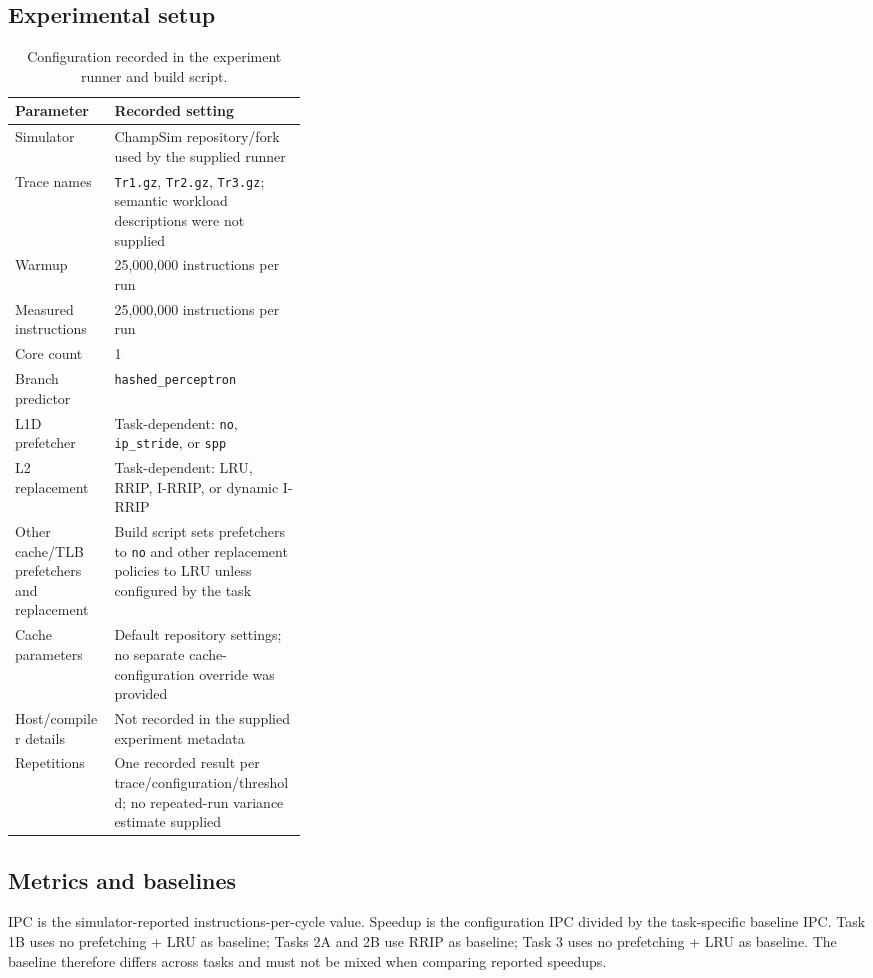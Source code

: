 \documentclass[11pt]{article}
\begin{document}
\subsection{Experimental setup}
\begin{table}[H]\centering
\caption{Configuration recorded in the experiment runner and build script.}
\begin{tabularx}{\linewidth}{>{\raggedright\arraybackslash}p{0.34\linewidth}X}
\toprule Parameter & Recorded setting \\
\midrule
Simulator & ChampSim repository/fork used by the supplied runner \\
Trace names & \texttt{Tr1.gz}, \texttt{Tr2.gz}, \texttt{Tr3.gz}; semantic workload descriptions were not supplied \\
Warmup & 25,000,000 instructions per run \\
Measured instructions & 25,000,000 instructions per run \\
Core count & 1 \\
Branch predictor & \texttt{hashed\_perceptron} \\
L1D prefetcher & Task-dependent: \texttt{no}, \texttt{ip\_stride}, or \texttt{spp} \\
L2 replacement & Task-dependent: LRU, RRIP, I-RRIP, or dynamic I-RRIP \\
Other cache/TLB prefetchers and replacement & Build script sets prefetchers to \texttt{no} and other replacement policies to LRU unless configured by the task \\
Cache parameters & Default repository settings; no separate cache-configuration override was provided \\
Host/compiler details & Not recorded in the supplied experiment metadata \\
Repetitions & One recorded result per trace/configuration/threshold; no repeated-run variance estimate supplied \\
\bottomrule
\end{tabularx}\end{table}

\subsection{Metrics and baselines}
IPC is the simulator-reported instructions-per-cycle value. Speedup is the configuration IPC divided by the task-specific baseline IPC. Task 1B uses no prefetching + LRU as baseline; Tasks 2A and 2B use RRIP as baseline; Task 3 uses no prefetching + LRU as baseline. The baseline therefore differs across tasks and must not be mixed when comparing reported speedups.
\end{document}

